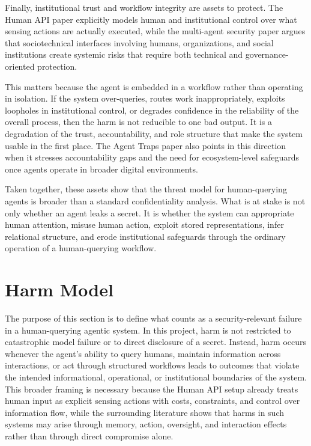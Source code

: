 \documentclass[11pt]{article}
\begin{document}
Finally, institutional trust and workflow integrity are assets to protect. The Human API paper explicitly models human and institutional control over what sensing actions are actually executed, while the multi-agent security paper argues that sociotechnical interfaces involving humans, organizations, and social institutions create systemic risks that require both technical and governance-oriented protection. \citep{oliver2026humanapi,schroeder2025multiagentsecurity,hammond2025multiagentrisks}

This matters because the agent is embedded in a workflow rather than operating in isolation. If the system over-queries, routes work inappropriately, exploits loopholes in institutional control, or degrades confidence in the reliability of the overall process, then the harm is not reducible to one bad output. It is a degradation of the trust, accountability, and role structure that make the system usable in the first place. The Agent Traps paper also points in this direction when it stresses accountability gaps and the need for ecosystem-level safeguards once agents operate in broader digital environments. \citep{franklin2026agenttraps}

Taken together, these assets show that the threat model for human-querying agents is broader than a standard confidentiality analysis. What is at stake is not only whether an agent leaks a secret. It is whether the system can appropriate human attention, misuse human action, exploit stored representations, infer relational structure, and erode institutional safeguards through the ordinary operation of a human-querying workflow.

\section{Harm Model}

The purpose of this section is to define what counts as a security-relevant failure in a human-querying agentic system. In this project, harm is not restricted to catastrophic model failure or to direct disclosure of a secret. Instead, harm occurs whenever the agent's ability to query humans, maintain information across interactions, or act through structured workflows leads to outcomes that violate the intended informational, operational, or institutional boundaries of the system. This broader framing is necessary because the Human API setup already treats human input as explicit sensing actions with costs, constraints, and control over information flow, while the surrounding literature shows that harms in such systems may arise through memory, action, oversight, and interaction effects rather than through direct compromise alone. \citep{oliver2026humanapi,franklin2026agenttraps,schroeder2025multiagentsecurity}
\end{document}
